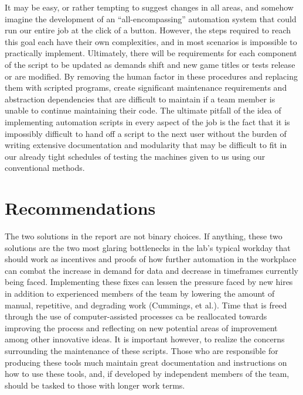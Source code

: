 \documentclass[12pt]{article}
\begin{document}
It may be easy, or rather tempting to suggest changes in all areas, and somehow imagine the development of an “all-encompassing” automation system that could run our entire job at the click of a button. However, the steps required to reach this goal each have their own complexities, and in most scenarios is impossible to practically implement. Ultimately, there will be requirements for each component of the script to be updated as demands shift and new game titles or tests release or are modified. By removing the human factor in these procedures and replacing them with scripted programs, create significant maintenance requirements and abstraction dependencies that are difficult to maintain if a team member is unable to continue maintaining their code. The ultimate pitfall of the idea of implementing automation scripts in every aspect of the job is the fact that it is impossibly difficult to hand off a script to the next user without the burden of writing extensive documentation and modularity that may be difficult to fit in our already tight schedules of testing the machines given to us using our conventional methods.

\newpage
\section{Recommendations}


The two solutions in the report are not binary choices. If anything, these two solutions are the two most glaring bottlenecks in the lab’s typical workday that should work as incentives and proofs of how further automation in the workplace can combat the increase in demand for data and decrease in timeframes currently being faced. Implementing these fixes can lessen the pressure faced by new hires in addition to experienced members of the team by lowering the amount of manual, repetitive, and degrading work (Cummings, et al.). Time that is freed through the use of computer-assisted processes ca be reallocated towards improving the process and reflecting on new potential areas of improvement among other innovative ideas.
	It is important however, to realize the concerns surrounding the maintenance of these scripts. Those who are responsible for producing these tools much maintain great documentation and instructions on how to use these tools, and, if developed by independent members of the team, should be tasked to those with longer work terms.  
\end{document}
